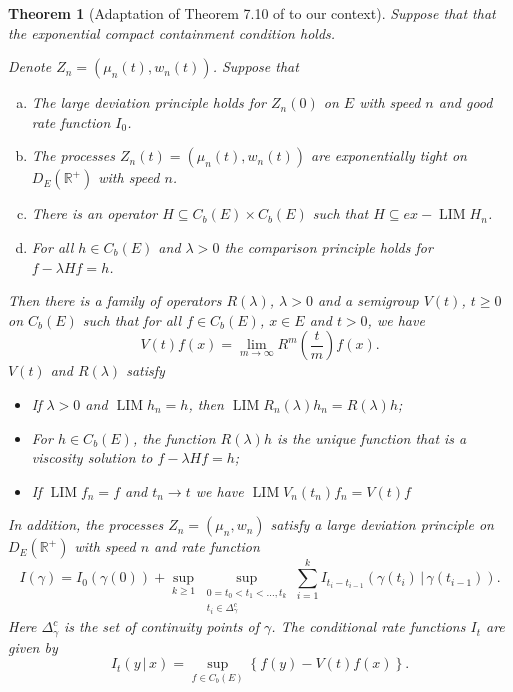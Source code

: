\documentclass[a4paper]{article}
\newcommand{\bR}{\mathbb{R}}
\DeclareMathOperator*{\LIM}{LIM}
\numberwithin{equation}{section}
\newtheorem{theorem}{Theorem}[section]
\theoremstyle{definition}
\begin{document}
\begin{theorem}[Adaptation of Theorem 7.10 of \cite{Kr19c} to our context] \label{theorem:abstract_LDP}
	Suppose that that the exponential compact containment condition holds.
	
	Denote $Z_n = (\mu_n(t),w_n(t))$. Suppose that
	\begin{enumerate}[(a)]
		\item \label{item:LDP_abstract_initialLDP} The large deviation principle holds for $Z_n(0)$ on $E$ with speed $n$ and good rate function $I_0$.
		\item \label{item:LDP_abstract_exptight} The processes $Z_n(t) = (\mu_n(t),w_n(t))$ are exponentially tight on $D_E(\bR^+)$ with speed $n$.
		\item \label{item:LDP_abstract_convergenceHn} There is an operator $H \subseteq C_b(E) \times C_b(E)$ such that $H \subseteq ex-\LIM H_n$.
		\item \label{item:LDP_abstract_comparison} For all $h \in C_b(E)$ and $\lambda > 0$ the comparison principle holds for $f - \lambda Hf = h$.
	\end{enumerate}
	
	Then there is a family of operators $R(\lambda)$, $\lambda > 0$ and a semigroup $V(t)$, $ t \geq 0$ on $C_b(E)$ such that for all $f \in C_b(E)$, $x \in E$ and $t > 0$, we have
	\begin{equation} \label{eqn:convergence_semigroup}
		V(t)f(x) = \lim_{m \rightarrow \infty} R^m\left(\frac{t}{m}\right) f(x).
	\end{equation}
	$V(t)$ and $R(\lambda)$ satisfy
	\begin{itemize}
		\item If $\lambda > 0$ and $\LIM h_n = h$, then $\LIM R_n(\lambda) h_n = R(\lambda) h$;
		\item For $h \in C_b(E)$, the function $R(\lambda)h$ is the unique function that is a viscosity solution to $f - \lambda H f = h$;
		\item If $\LIM f_n = f$ and $t_n \rightarrow t$ we have $\LIM V_n(t_n)f_n = V(t)f$
	\end{itemize}
	In addition, the processes $Z_n =(\mu_n,w_n)$ satisfy a large deviation principle on $D_E(\bR^+)$ with speed $n$ and rate function
	\begin{equation} \label{eqn:LDP_rate2}
		I(\gamma) = I_0(\gamma(0)) + \sup_{k \geq 1} \sup_{\substack{0 = t_0 < t_1 < \dots, t_k \\ t_i \in \Delta_\gamma^c}} \sum_{i=1}^{k} I_{t_i - t_{i-1}}(\gamma(t_i) \, | \, \gamma(t_{i-1})).
	\end{equation}
	Here $\Delta_\gamma^c$ is the set of continuity points of $\gamma$. The conditional rate functions $I_t$ are given by
	\begin{equation*}
		I_t(y \, | \, x) = \sup_{f \in C_b(E)} \left\{f(y) - V(t)f(x) \right\}.
	\end{equation*}
\end{theorem}
\end{document}
